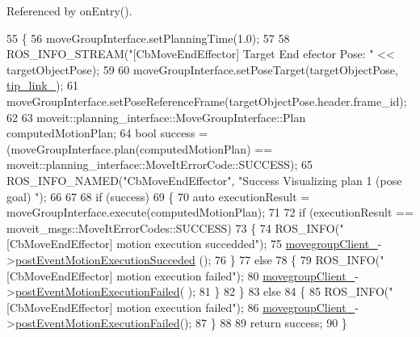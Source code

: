 Referenced by on\+Entry().


\begin{DoxyCode}
55 \{
56     moveGroupInterface.setPlanningTime(1.0);
57 
58     ROS\_INFO\_STREAM(\textcolor{stringliteral}{"[CbMoveEndEffector] Target End efector Pose: "} << targetObjectPose);
59 
60     moveGroupInterface.setPoseTarget(targetObjectPose, \hyperlink{classmoveit__z__client_1_1CbMoveEndEffector_abd92e9d3d67bdde11f9e38e0b44a2b8b}{tip\_link\_});
61     moveGroupInterface.setPoseReferenceFrame(targetObjectPose.header.frame\_id);
62 
63     moveit::planning\_interface::MoveGroupInterface::Plan computedMotionPlan;
64     \textcolor{keywordtype}{bool} success = (moveGroupInterface.plan(computedMotionPlan) == 
      moveit::planning\_interface::MoveItErrorCode::SUCCESS);
65     ROS\_INFO\_NAMED(\textcolor{stringliteral}{"CbMoveEndEffector"}, \textcolor{stringliteral}{"Success Visualizing plan 1 (pose goal) %
      "});
66 
67     
68     \textcolor{keywordflow}{if} (success)
69     \{
70         \textcolor{keyword}{auto} executionResult = moveGroupInterface.execute(computedMotionPlan);
71 
72         \textcolor{keywordflow}{if} (executionResult == moveit\_msgs::MoveItErrorCodes::SUCCESS)
73         \{
74             ROS\_INFO(\textcolor{stringliteral}{"[CbMoveEndEffector] motion execution succedded"});
75             \hyperlink{classmoveit__z__client_1_1CbMoveEndEffector_af62a434c16849885a085e30b8ae70e00}{movegroupClient\_}->\hyperlink{classmoveit__z__client_1_1ClMoveGroup_ad6b8f0acbe3d11b5c39a83911a3d95b8}{postEventMotionExecutionSucceded}
      ();
76         \}
77         \textcolor{keywordflow}{else}
78         \{
79             ROS\_INFO(\textcolor{stringliteral}{"[CbMoveEndEffector] motion execution failed"});
80             \hyperlink{classmoveit__z__client_1_1CbMoveEndEffector_af62a434c16849885a085e30b8ae70e00}{movegroupClient\_}->\hyperlink{classmoveit__z__client_1_1ClMoveGroup_a42bede73264ae2d5dfe0117315042acb}{postEventMotionExecutionFailed}(
      );
81         \}
82     \}
83     \textcolor{keywordflow}{else}
84     \{
85         ROS\_INFO(\textcolor{stringliteral}{"[CbMoveEndEffector] motion execution failed"});
86         \hyperlink{classmoveit__z__client_1_1CbMoveEndEffector_af62a434c16849885a085e30b8ae70e00}{movegroupClient\_}->\hyperlink{classmoveit__z__client_1_1ClMoveGroup_a42bede73264ae2d5dfe0117315042acb}{postEventMotionExecutionFailed}();
87     \}
88 
89     \textcolor{keywordflow}{return} success;
90 \}
\end{DoxyCode}

